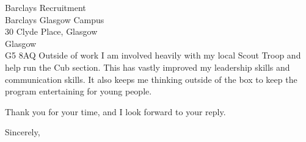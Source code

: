 \documentclass[10pt]{letter} %
\begin{document}
\begin{letter}{Barclays Recruitment \\ Barclays Glasgow Campus \\ 30 Clyde Place, Glasgow \\ Glasgow \\ G5 8AQ}
Outside of work I am involved heavily with my local Scout Troop and help run the Cub section. This has vastly improved my leadership skills and communication skills. It also keeps me thinking outside of the box to keep the program entertaining for young people.
		
		

	
	Thank you for your time, and I look forward to your reply.
		
		\closing{Sincerely,}
		
		
	\end{letter}
	
\end{document}
